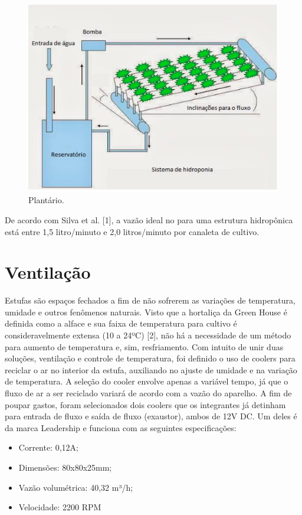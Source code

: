 \begin{figure}[H]
	\centering
	\includegraphics[width=13cm]{figuras/plantario.png}
	\caption{Plantário.}
	\label{plantario}
\end{figure}

De acordo com Silva et al. [1], a vazão ideal no para uma estrutura hidropônica está entre 1,5 litro/minuto e 2,0 litros/minuto por canaleta de cultivo.

\section{Ventilação}
Estufas são espaços fechados a fim de não sofrerem as variações de temperatura, umidade e outros fenômenos naturais. Visto que a hortaliça da Green House é definida como a alface e sua faixa de temperatura para cultivo é consideravelmente extensa (10 a 24ºC) [2], não há a necessidade de um método para aumento de temperatura e, sim, resfriamento. Com intuito de unir duas soluções, ventilação e controle de temperatura, foi definido o uso de coolers para reciclar o ar no interior da estufa, auxiliando no ajuste de umidade e na variação de temperatura. A seleção do cooler envolve apenas a variável tempo, já que o fluxo de ar a ser reciclado variará de acordo com a vazão do aparelho. A fim de poupar gastos, foram selecionados dois coolers que os integrantes já detinham para entrada de fluxo e saída de fluxo (exaustor), ambos de 12V DC. Um deles é da marca Leadership e funciona com as seguintes especificações:

\begin{itemize}
	\item Corrente: 0,12A;
	\item Dimensões: 80x80x25mm;
	\item Vazão volumétrica: 40,32 m³/h;
	\item Velocidade: 2200 RPM  
\end{itemize}

